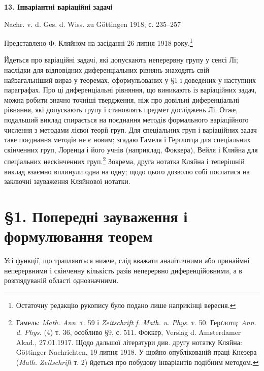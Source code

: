 \documentclass[11pt]{article}
\begin{document}

\begin{center}
{\Large\bfseries 13. Інваріантні варіаційні задачі}\par
\vspace{1.5em}
Nachr. v. d. Ges. d. Wiss. zu Göttingen 1918, с. 235--257
\end{center}

\vspace{3em}
\begin{center}
Представлено Ф. Кляйном на засіданні 26 липня 1918 року.\footnote{Остаточну редакцію рукопису було подано лише наприкінці вересня.}
\end{center}

Йдеться про варіаційні задачі, які допускають неперервну групу у сенсі Лі; наслідки для відповідних диференціальних рівнянь знаходять свій найзагальніший вираз у теоремах, сформульованих у \S{}1 і доведених у наступних параграфах. Про ці диференціальні рівняння, що виникають із варіаційних задач, можна робити значно точніші твердження, ніж про довільні диференціальні рівняння, які допускають групу і становлять предмет досліджень Лі. Отже, подальший виклад спирається на поєднання методів формального варіаційного числення з методами лієвої теорії груп. Для спеціальних груп і варіаційних задач таке поєднання методів не є новим; згадаю Гамеля і Герґлотца для спеціальних скінченних груп, Лоренца і його учнів (наприклад, Фоккера), Вейля і Кляйна для спеціальних нескінченних груп.\footnote{Гамель: \emph{Math. Ann.} т. 59 і \emph{Zeitschrift f. Math. u. Phys.} т. 50. Герґлотц: \emph{Ann. d. Phys.} (4) т. 36, особливо \S{}9, с. 511. Фоккер, Verslag d. Amsterdamer Akad., 27.01.1917. Щодо дальшої літератури див. другу нотатку Кляйна: Göttinger Nachrichten, 19 липня 1918. У щойно опублікованій праці Кнезера (\emph{Math. Zeitschrift} т. 2) йдеться про побудову інваріантів подібним методом.} Зокрема, друга нотатка Кляйна і теперішній виклад взаємно вплинули одна на одну; щодо цього дозволю собі послатися на заключні зауваження Кляйнової нотатки.

\section*{\S{}1. Попередні зауваження і формулювання теорем}

Усі функції, що трапляються нижче, слід вважати аналітичними або принаймні неперервними і скінченну кількість разів неперервно диференційовними, а в розглядуваній області однозначними.
\end{document}
